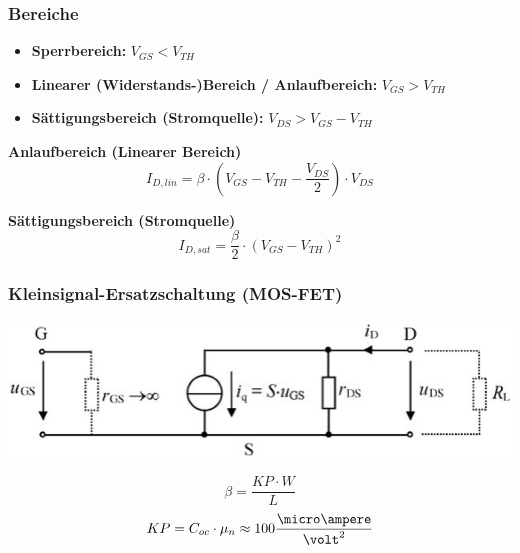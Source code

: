 \subsubsection{Bereiche}

\begin{itemize}
    \item \textbf{Sperrbereich:} $V_{GS} < V_{TH}$ 
    \item \textbf{Linearer (Widerstands-)Bereich / Anlaufbereich:} $V_{GS} > V_{TH}$
    \item \textbf{Sättigungsbereich (Stromquelle):} $V_{DS} > V_{GS} - V_{TH}$
\end{itemize}

\vspace{0.2cm}

\begin{minipage}[t]{0.48\columnwidth}
    \textbf{Anlaufbereich (Linearer Bereich)}
    $$ I_{D,lin} = \beta \cdot ( V_{GS} - V_{TH} - \frac{V_{DS}}{2} ) \cdot V_{DS} $$
\end{minipage}
\hfill
\begin{minipage}[t]{0.48\columnwidth}
    \textbf{Sättigungsbereich (Stromquelle)}
    $$ I_{D,sat} = \frac{\beta}{2} \cdot ( V_{GS} - V_{TH} )^2 $$
\end{minipage}



\subsubsection{Kleinsignal-Ersatzschaltung (MOS-FET)}

\begin{minipage}[t]{0.65\columnwidth}
    \includegraphics[align=t, width=\columnwidth]{images/mos_fet_kleinsignalersatzschaltung.png}
\end{minipage}
\hfill
\begin{minipage}[t]{0.33\columnwidth}
    $$ \beta = \frac{KP \cdot W}{L} $$
    $$ KP = C_{oc} \cdot \mu_n \approx 100 \frac{\micro \ampere}{\volt^2} $$  %
\end{minipage}

